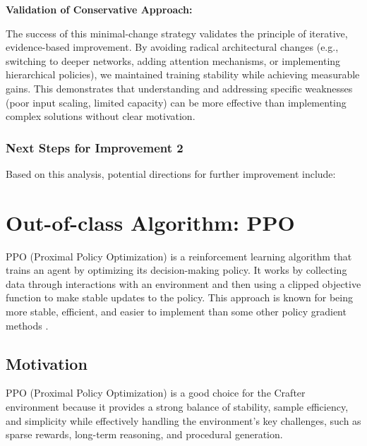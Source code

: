 \documentclass[twocolumn]{article}
\begin{document}
\textbf{Validation of Conservative Approach:}

The success of this minimal-change strategy validates the principle of iterative, evidence-based improvement. By avoiding radical architectural changes (e.g., switching to deeper networks, adding attention mechanisms, or implementing hierarchical policies), we maintained training stability while achieving measurable gains. This demonstrates that understanding and addressing specific weaknesses (poor input scaling, limited capacity) can be more effective than implementing complex solutions without clear motivation.

\subsubsection*{Next Steps for Improvement 2}

Based on this analysis, potential directions for further improvement include:


\section*{Out-of-class Algorithm: PPO}

PPO (Proximal Policy Optimization) is a reinforcement learning algorithm that trains an agent by optimizing its decision-making policy. It works by collecting data through interactions with an environment and then using a clipped objective function to make stable updates to the policy. This approach is known for being more stable, efficient, and easier to implement than some other policy gradient methods \parencite{schulman}.

\subsection*{Motivation}
PPO (Proximal Policy Optimization) is a good choice for the Crafter environment because it provides a strong balance of stability, sample efficiency, and simplicity while effectively handling the environment's key challenges, such as sparse rewards, long-term reasoning, and procedural generation. 
\end{document}
